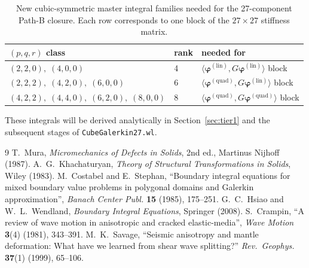 \documentclass[11pt,a4paper]{article}
\newcommand{\bphi}{\bm{\varphi}}
\theoremstyle{plain}
\theoremstyle{definition}
\theoremstyle{remark}
\begin{document}
\begin{table}[h]
\centering
\begin{tabular}{lll}
\toprule
$(p,q,r)$ class & rank & needed for \\
\midrule
$(2,2,0),\;(4,0,0)$         & 4 & $\langle \bphi^{(\text{lin})},G\bphi^{(\text{lin})}\rangle$ block \\
$(2,2,2),\;(4,2,0),\;(6,0,0)$ & 6 & $\langle \bphi^{(\text{quad})},G\bphi^{(\text{lin})}\rangle$ block \\
$(4,2,2),\;(4,4,0),\;(6,2,0),\;(8,0,0)$ & 8 & $\langle \bphi^{(\text{quad})},G\bphi^{(\text{quad})}\rangle$ block \\
\bottomrule
\end{tabular}
\caption{New cubic-symmetric master integral families needed for the
27-component Path-B closure. Each row corresponds to one block of the
$27\times 27$ stiffness matrix.}
\label{tab:new-masters}
\end{table}

These integrals will be derived analytically in Section~\ref{sec:tier1}
and the subsequent stages of \texttt{CubeGalerkin27.wl}.




\begin{thebibliography}{9}
 T.\ Mura, \emph{Micromechanics of Defects in Solids},
   2nd ed., Martinus Nijhoff (1987).
 A.\ G.\ Khachaturyan, \emph{Theory of Structural
   Transformations in Solids}, Wiley (1983).
 M.\ Costabel and E.\ Stephan, ``Boundary
   integral equations for mixed boundary value problems in polygonal
   domains and Galerkin approximation'', \emph{Banach Center Publ.}
   \textbf{15} (1985), 175--251.
 G.\ C.\ Hsiao and W.\ L.\ Wendland,
   \emph{Boundary Integral Equations}, Springer (2008).
 S.\ Crampin, ``A review of wave motion in
   anisotropic and cracked elastic-media'',
   \emph{Wave Motion} \textbf{3}(4) (1981), 343--391.
 M.\ K.\ Savage, ``Seismic anisotropy and mantle
   deformation: What have we learned from shear wave splitting?''
   \emph{Rev.\ Geophys.} \textbf{37}(1) (1999), 65--106.
\end{thebibliography}
\end{document}
